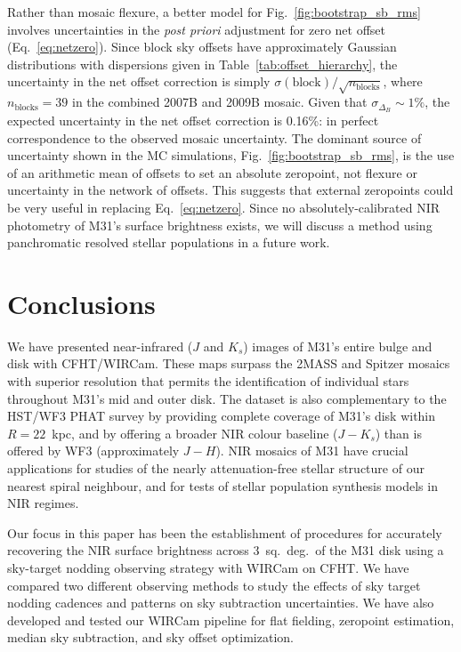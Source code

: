 \documentclass[iop]{emulateapj}
\newcommand{\Fig}[1]{Fig.~\ref{fig:#1}}  %
\newcommand{\Eq}[1]{Eq.~\ref{eq:#1}}  %
\newcommand{\Tab}[1]{Table~\ref{tab:#1}}  %
\begin{document}
Rather than mosaic flexure, a better model for \Fig{bootstrap_sb_rms} involves uncertainties in the \textit{post priori} adjustment for zero net offset (\Eq{netzero}).
Since block sky offsets have approximately Gaussian distributions with dispersions given in \Tab{offset_hierarchy}, the uncertainty in the net offset correction is simply $\sigma(\mathrm{block})/\sqrt{n_\mathrm{blocks}}$, where $n_\mathrm{blocks}=39$ in the combined 2007B and 2009B mosaic.
Given that $\sigma_{\Delta_B}\sim 1\%$, the expected uncertainty in the net offset correction is 0.16\%: in perfect correspondence to the observed mosaic uncertainty.
The dominant source of uncertainty shown in the MC simulations, \Fig{bootstrap_sb_rms}, is the use of an arithmetic mean of offsets to set an absolute zeropoint, not flexure or uncertainty in the network of offsets.
This suggests that external zeropoints could be very useful in replacing \Eq{netzero}.
Since no absolutely-calibrated NIR photometry of M31's surface brightness exists, we will discuss a method using panchromatic resolved stellar populations in a future work.

\section{Conclusions}
\label{sec:conclusions}

We have presented near-infrared ($J$ and $K_s$) images of M31's entire bulge and disk with CFHT/WIRCam.
These maps surpass the 2MASS \citep{Beaton:2007} and Spitzer \citep{Barmby:2006} mosaics with superior resolution that permits the identification of individual stars throughout M31's mid and outer disk.
The dataset is also complementary to the HST/WF3 PHAT survey \citep{Dalcanton:2012} by providing complete coverage of M31's disk within $R=22$~kpc, and by offering a broader NIR colour baseline ($J-K_s$) than is offered by WF3 (approximately $J-H$).
NIR mosaics of M31 have crucial applications for studies of the nearly attenuation-free stellar structure of our nearest spiral neighbour, and for tests of stellar population synthesis models in NIR regimes.

Our focus in this paper has been the establishment of procedures for accurately recovering the NIR surface brightness across 3~sq.~deg.\ of the M31 disk using a sky-target nodding observing strategy with WIRCam on CFHT\@.
We have compared two different observing methods to study the effects of sky target nodding cadences and patterns on sky subtraction uncertainties.
We have also developed and tested our WIRCam pipeline for flat fielding, zeropoint estimation, median sky subtraction, and sky offset optimization.
\end{document}
